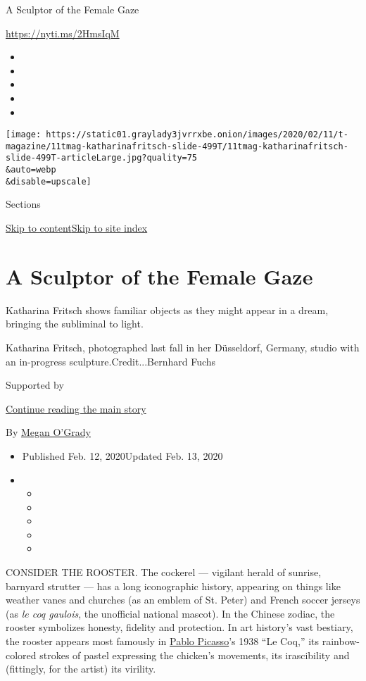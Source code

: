 A Sculptor of the Female Gaze

\url{https://nyti.ms/2HmsIqM}

\begin{itemize}
\item
\item
\item
\item
\item
\end{itemize}

\texttt{[image: https://static01.graylady3jvrrxbe.onion/images/2020/02/11/t-magazine/11tmag-katharinafritsch-slide-499T/11tmag-katharinafritsch-slide-499T-articleLarge.jpg?quality=75\\\&auto=webp\\\&disable=upscale]}

Sections

\protect\hyperlink{site-content}{Skip to
content}\protect\hyperlink{site-index}{Skip to site index}

\hypertarget{a-sculptor-of-the-female-gaze}{%
\section{A Sculptor of the Female
Gaze}\label{a-sculptor-of-the-female-gaze}}

Katharina Fritsch shows familiar objects as they might appear in a
dream, bringing the subliminal to light.

Katharina Fritsch, photographed last fall in her Düsseldorf, Germany,
studio with an in-progress sculpture.Credit...Bernhard Fuchs

Supported by

\protect\hyperlink{after-sponsor}{Continue reading the main story}

By \href{https://www.nytimes3xbfgragh.onion/by/megan-o-grady}{Megan
O'Grady}

\begin{itemize}
\item
  Published Feb. 12, 2020Updated Feb. 13, 2020
\item
  \begin{itemize}
  \item
  \item
  \item
  \item
  \item
  \end{itemize}
\end{itemize}

CONSIDER THE ROOSTER. The cockerel --- vigilant herald of sunrise,
barnyard strutter --- has a long iconographic history, appearing on
things like weather vanes and churches (as an emblem of St. Peter) and
French soccer jerseys (as \emph{le coq gaulois}, the unofficial national
mascot). In the Chinese zodiac, the rooster symbolizes honesty, fidelity
and protection. In art history's vast bestiary, the rooster appears most
famously in
\href{https://www.nytimes3xbfgragh.onion/2019/06/11/t-magazine/francoise-gilot-picasso.html}{Pablo
Picasso}'s 1938 ``Le Coq,'' its rainbow-colored strokes of pastel
expressing the chicken's movements, its irascibility and (fittingly, for
the artist) its virility.

